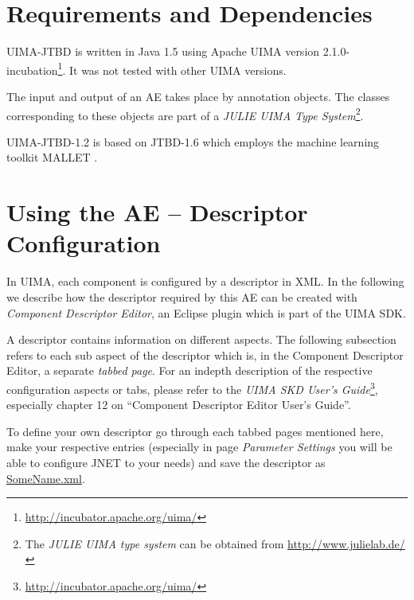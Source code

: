 \documentclass[11pt,a4paper,halfparskip]{scrartcl}
\begin{document}


\section{Requirements and Dependencies}

UIMA-JTBD is written in Java 1.5 using Apache UIMA version
2.1.0-incubation\footnote{\url{http://incubator.apache.org/uima/}}. It
was not tested with other UIMA versions.

The input and output of an AE takes place by annotation objects. The
classes corresponding to these objects are part of a \emph{JULIE UIMA
  Type System}\footnote{The \emph{JULIE UIMA type system} can be
  obtained from \url{http://www.julielab.de/}}.

UIMA-JTBD-1.2 is based on JTBD-1.6 which employs the machine learning
toolkit MALLET \cite{mallet}.




\section{Using the AE -- Descriptor Configuration}

In UIMA, each component is configured by a descriptor in XML. In the
following we describe how the descriptor required by this AE can be
created with \emph{Component Descriptor Editor}, an Eclipse plugin
which is part of the UIMA SDK.

A descriptor contains information on different aspects. The following
subsection refers to each sub aspect of the descriptor which is, in
the Component Descriptor Editor, a separate \emph{tabbed page}. For an
indepth description of the respective configuration aspects or tabs,
please refer to the \emph{UIMA SKD User's
  Guide}\footnote{\url{http://incubator.apache.org/uima/}}, especially
chapter 12 on ``Component Descriptor Editor User's Guide''.

To define your own descriptor go through each tabbed pages mentioned
here, make your respective entries (especially in page \emph{Parameter
  Settings} you will be able to configure JNET to your needs) and save
the descriptor as \url{SomeName.xml}.
\end{document}
